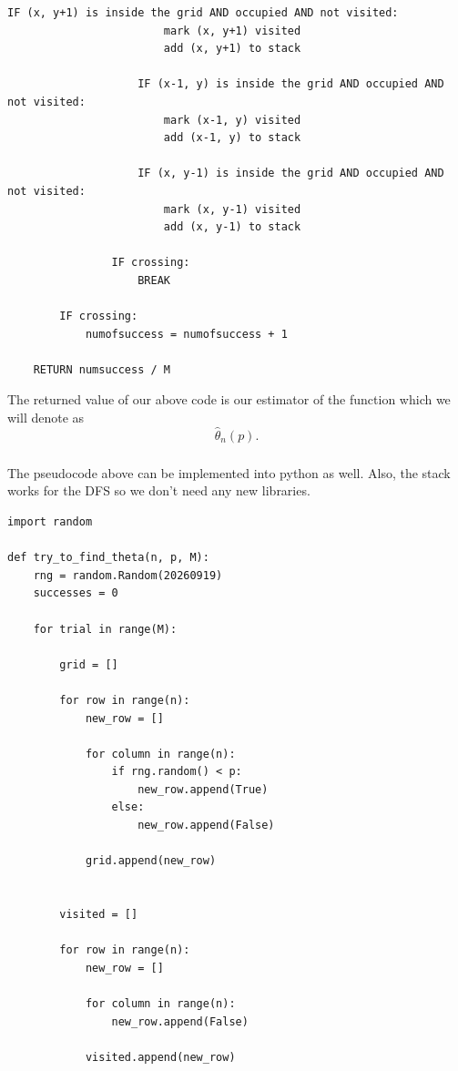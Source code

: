 \documentclass[11pt]{scrartcl}
\begin{document}
\begin{soln}
\begin{lstlisting}[style=pseudoStyle]
                    IF (x, y+1) is inside the grid AND occupied AND not visited:
                        mark (x, y+1) visited
                        add (x, y+1) to stack

                    IF (x-1, y) is inside the grid AND occupied AND not visited:
                        mark (x-1, y) visited
                        add (x-1, y) to stack

                    IF (x, y-1) is inside the grid AND occupied AND not visited:
                        mark (x, y-1) visited
                        add (x, y-1) to stack

                IF crossing:
                    BREAK

        IF crossing:
            numofsuccess = numofsuccess + 1

    RETURN numsuccess / M
\end{lstlisting}

			
			The returned value of our above code is our estimator of the function which we will denote as
			\[
			\widehat{\theta}_n(p).
			\]
			
			
			
			\subsubsection*{}
			
			The pseudocode above can be implemented into python as well. Also, the stack works for the DFS so we don't need any new libraries.
			
			\begin{lstlisting}[style=pythonStyle]
import random

def try_to_find_theta(n, p, M):
	rng = random.Random(20260919)
	successes = 0
	
	for trial in range(M):
	
		grid = []
		
		for row in range(n):
			new_row = []
		
			for column in range(n):
				if rng.random() < p:
					new_row.append(True)
				else:
					new_row.append(False)
		
			grid.append(new_row)
		
		
		visited = []
		
		for row in range(n):
			new_row = []
		
			for column in range(n):
				new_row.append(False)
		
			visited.append(new_row)
		

\end{lstlisting}
\end{soln}
\end{document}
